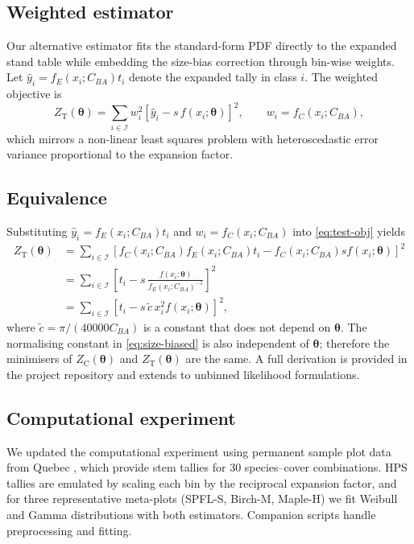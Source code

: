 \subsection{Weighted estimator}
Our alternative estimator fits the standard-form PDF directly to the expanded
stand table while embedding the size-bias correction through bin-wise weights.
Let $\hat{y}_i = f_E(x_i; C_{BA}) t_i$ denote the expanded tally in class $i$.
The weighted objective is
\begin{equation}
  Z_{\text{T}}(\boldsymbol{\theta}) =
  \sum_{i \in \mathcal{I}} w_i^2
  \left[\hat{y}_i - s \, f(x_i; \boldsymbol{\theta})\right]^2,
  \qquad
  w_i = f_C(x_i; C_{BA}),
  \label{eq:test-obj}
\end{equation}
which mirrors a non-linear least squares problem with heteroscedastic error
variance proportional to the expansion factor.

\subsection{Equivalence}
Substituting $\hat{y}_i = f_E(x_i; C_{BA}) t_i$ and $w_i = f_C(x_i; C_{BA})$
into \eqref{eq:test-obj} yields
\begin{align}
  Z_{\text{T}}(\boldsymbol{\theta})
    &= \sum_{i \in \mathcal{I}}
       \left[f_C(x_i; C_{BA}) f_E(x_i; C_{BA}) t_i - f_C(x_i; C_{BA}) s f(x_i; \boldsymbol{\theta})\right]^2 \nonumber \\
    &= \sum_{i \in \mathcal{I}}
       \left[t_i - s \, \frac{f(x_i; \boldsymbol{\theta})}{f_E(x_i; C_{BA})^{-1}}\right]^2 \nonumber \\
    &= \sum_{i \in \mathcal{I}}
       \left[t_i - s \, \tilde{c} \, x_i^2 f(x_i; \boldsymbol{\theta})\right]^2,
\end{align}
where $\tilde{c} = \pi/(40000 C_{BA})$ is a constant that does not depend on
$\boldsymbol{\theta}$. The normalising constant in \eqref{eq:size-biased} is
also independent of $\boldsymbol{\theta}$; therefore the minimisers of
$Z_{\text{C}}(\boldsymbol{\theta})$ and $Z_{\text{T}}(\boldsymbol{\theta})$ are
the same. A full derivation is provided in the project repository and extends
to unbinned likelihood formulations.

\subsection{Computational experiment}

We updated the computational experiment using permanent sample plot data from
Quebec \citep{gouvernement2019}, which provide stem tallies for 30
species--cover combinations. HPS tallies are emulated by scaling each bin by the reciprocal
expansion factor, and for three representative meta-plots (SPFL-S, Birch-M,
Maple-H) we fit Weibull and Gamma distributions with both estimators.
Companion scripts handle preprocessing and fitting.
